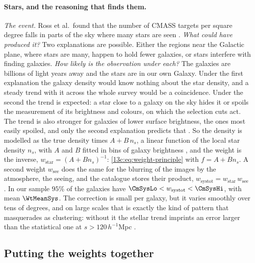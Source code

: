 \paragraph{Stars, and the reasoning that finds them.}
\emph{The event.} Ross et al.\ found that the number of CMASS targets per square
degree falls in parts of the sky where many stars are seen \cite{Ross2012}.
\emph{What could have produced it?} Two explanations are possible. Either the
regions near the Galactic plane, where stars are many, happen to hold fewer
galaxies, or stars interfere with finding galaxies. \emph{How likely is the observation
under each?} The galaxies are billions of light years away and the stars are in our
own Galaxy. Under the first explanation the galaxy density would know nothing about
the star density, and a steady trend with it across the whole survey would be a
coincidence. Under the second the trend is expected: a star close to a galaxy on the
sky hides it or spoils the measurement of its brightness and colours, on which the
selection cuts act. The trend is also stronger for galaxies of lower surface
brightness, the ones most easily spoiled, and only the second explanation predicts
that \cite{Ross2012}. So the
density is modelled as the true density times $A+B\,n_s$, a linear function of the
local star density $n_s$, with $A$ and $B$ fitted in bins of galaxy brightness
, and the weight is the inverse,
$w_{\mathrm{star}}=(A+Bn_s)^{-1}$: \eqref{13c:eq:weight-principle} with
$f=A+Bn_s$. A second weight $w_{\mathrm{see}}$ does the same for the blurring of the
images by the atmosphere, the seeing, and the catalogue stores their product,
$w_{\mathrm{systot}}=w_{\mathrm{star}}\,w_{\mathrm{see}}$ .
In our sample $95\%$ of the galaxies have $\CmSysLo<w_{\mathrm{systot}}<\CmSysHi$, with
mean $\WtMeanSys$. The correction is small per galaxy, but it varies smoothly over
tens of degrees, and on large scales that is exactly the kind of pattern that
masquerades as clustering: without it the stellar trend imprints an error larger
than the statistical one at $s>120\,h^{-1}$Mpc \cite{Ross2012}.

\subsection{Putting the weights together}
\label{13c:sec:wtot}

